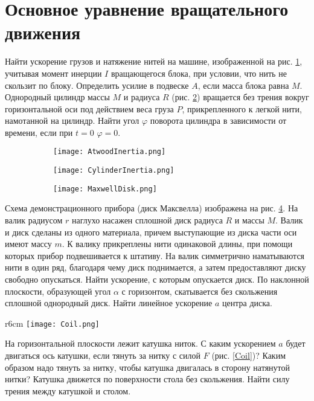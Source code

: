 \section{Основное уравнение вращательного движения}
\AddProb Найти ускорение грузов и натяжение нитей на машине, изображенной на рис. \ref{AtwoodInertia}, учитывая момент инерции $I$ вращающегося блока, при условии, что нить не скользит по блоку. Определить усилие в подвеске $A$, если масса блока равна $M$.
\AddProb Однородный цилиндр массы $M$ и радиуса $R$ (рис. \ref{CylinderInertia}) вращается без трения вокруг горизонтальной оси под действием веса груза $P$, прикрепленного к легкой нити, намотанной на цилиндр. Найти угол $\varphi$ поворота цилиндра в зависимости от времени, если при $t = 0$ $\varphi = 0$.
\begin{figure}[h]
\centering
\begin{subfigure}{.33\textwidth}
  \centering
\texttt{[image: AtwoodInertia.png]}
\caption{}
\label{AtwoodInertia}
\end{subfigure}%
\begin{subfigure}{.33\textwidth}
  \centering
\texttt{[image: CylinderInertia.png]}
\caption{}
\label{CylinderInertia}
\end{subfigure}
\begin{subfigure}{.33\textwidth}
  \centering
\texttt{[image: MaxwellDisk.png]}
\caption{}
\label{MaxwellDisk}
\end{subfigure}
\caption{}
\end{figure}
\AddProb Схема демонстрационного прибора (диск Максвелла) изображена на рис. \ref{MaxwellDisk}. На валик радиусом $r$ наглухо насажен сплошной диск радиуса $R$ и массы $M$. Валик и диск сделаны из одного материала, причем выступающие из диска части оси имеют массу $m$. К валику прикреплены нити одинаковой длины, при помощи которых прибор подвешивается к штативу. На валик симметрично наматываются нити в один ряд, благодаря чему диск поднимается, а затем предоставляют диску свободно опускаться. Найти ускорение, с которым опускается диск.
\AddProb По наклонной плоскости, образующей угол $\alpha$ с горизонтом, скатывается без скольжения сплошной однородный диск. Найти линейное ускорение $a$ центра диска.

\begin{wrapfigure}[9]{r}{6cm}
\texttt{[image: Coil.png]}
\caption{}
\label{Coil}
\end{wrapfigure}
\AddProb На горизонтальной плоскости лежит катушка ниток. С каким
ускорением $a$ будет двигаться ось катушки, если тянуть за нитку с силой $F$ (рис. \ref{Coil})? Каким образом	надо тянуть за нитку, чтобы катушка двигалась в сторону натянутой нитки? Катушка движется по поверхности стола без скольжения. Найти силу трения между катушкой и столом.

